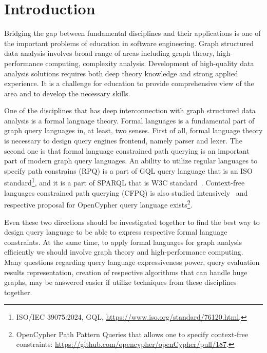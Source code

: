 \documentclass[sigconf]{acmart}
\begin{document}
\section{Introduction}

Bridging the gap between fundamental disciplines and their applications is one of the important problems of education in software engineering.
Graph structured data analysis involves broad range of areas including graph theory, high-performance computing, complexity analysis.
Development of high-quality data analysis solutions requires both deep theory knowledge and strong applied experience. 
It is a challenge for education to provide comprehensive view of the area and to develop the necessary skills.

One of the disciplines that has deep interconnection with graph structured data analysis is a formal language theory.
Formal languages is a fundamental part of graph query languages in, at least, two senses.
First of all, formal language theory is necessary to design query engines frontend, namely parser and lexer.
The second one is that formal language constrained path querying is an important part of modern graph query languages. 
An ability to utilize regular languages to specify path constrains (RPQ) is a part of GQL query language that is an ISO standard\footnote{ISO/IEC 39075:2024, GQL, \url{https://www.iso.org/standard/76120.html}.}, and it is a part of SPARQL that is W3C standard~\cite{2013sparql}.
Context-free languages constrained path querying (CFPQ) is also studied intensively~\cite{10.1145/3335783.3335791,10.1145/3167132.3167265,HELLINGS2025102475,10.1145/3398682.3399163} and respective proposal for OpenCypher query language exists\footnote{OpenCypher Path Pattern Queries that allows one to specify context-free constraints: \url{https://github.com/opencypher/openCypher/pull/187}.}.

Even these two directions should be investigated together to find the best way to design query language to be able to express respective formal language constraints.
At the same time, to apply formal languages for graph analysis efficiently we should involve graph theory and high-performance computing.
Many questions regarding query language expressiveness power, query evaluation results representation, creation of respective algorithms that can handle huge graphs, may be answered easier if utilize techniques from these disciplines together.
\end{document}
